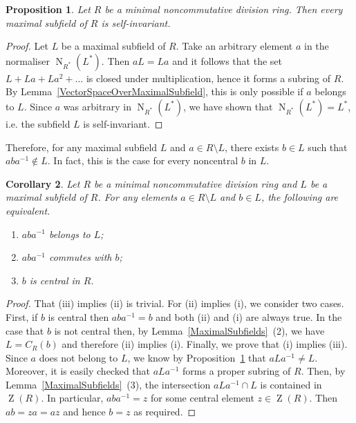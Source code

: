 \documentclass[11pt]{article}
\DeclareMathOperator{\Z}{Z}
\DeclareMathOperator{\N}{N}
\newtheorem{corollary}{Corollary}[section]
\newtheorem{proposition}[corollary]{Proposition}
\theoremstyle{definition}
\begin{document}
\begin{proposition}\label{MaximalSubfieldsNormal}
Let $R$ be a minimal noncommutative division ring. Then every maximal subfield of $R$ is self-invariant.
\end{proposition}

\begin{proof}
Let $L$ be a maximal subfield of $R$. Take an arbitrary element $a$ in the normaliser $\N_{R^\ast} (L^\ast)$. Then $aL= La$ and it follows that the set $L+La+La^2+\ldots$ is closed under multiplication, hence it forms a subring of $R$. By Lemma~\ref{VectorSpaceOverMaximalSubfield}, this is only possible if $a$ belongs to $L$. Since $a$ was arbitrary in $\N_{R^\ast}(L^\ast)$, we have shown that $\N_{R^\ast}(L^\ast)=L^\ast$, i.e. the subfield $L$ is self-invariant.
\end{proof}

Therefore, for any maximal subfield $L$ and $a\in R\setminus L$, there exists $b\in L$ such that $aba^{-1}\not\in L$. In fact, this is the case for every noncentral $b$ in $L$.

\begin{corollary}\label{ConjugacyMovesSubfields}
Let $R$ be a minimal noncommutative division ring and $L$ be a maximal subfield of $R$. For any elements $a\in R\setminus L$ and $b\in L$, the following are equivalent.
\begin{enumerate}[topsep=0pt]
\item[(i)] $aba^{-1}$ belongs to $L$;
\item[(ii)] $aba^{-1}$ commutes with $b$;
\item[(iii)] $b$ is central in $R$.
\end{enumerate}
\end{corollary}

\begin{proof}
That (iii) implies (ii) is trivial. For (ii) implies (i), we consider two cases. First, if $b$ is central then $aba^{-1}=b$ and both (ii) and (i) are always true. In the case that $b$ is not central then, by Lemma~\ref{MaximalSubfields}~(2), we have $L=C_R(b)$ and therefore (ii) implies (i). Finally, we prove that (i) implies (iii). Since $a$ does not belong to $L$, we know by Proposition~\ref{MaximalSubfieldsNormal} that $aLa^{-1}\neq L$. Moreover, it is easily checked that $aLa^{-1}$ forms a proper subring of $R$. Then, by Lemma~\ref{MaximalSubfields}~(3), the intersection $aLa^{-1}\cap L$ is contained in $\Z(R)$. In particular, $aba^{-1}=z$ for some central element $z\in\Z(R)$. Then $ab=za=az$ and hence $b=z$ as required.
\end{proof}
\end{document}
